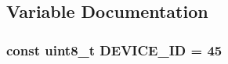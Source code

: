 \subsection{Variable Documentation}
\hypertarget{Surrogate_8ino_ab626366a28e9f4d297a10d5958647f3a}{
\subsubsection[{D\-E\-V\-I\-C\-E\-\_\-\-I\-D}]{\setlength{\rightskip}{0pt plus 5cm}const uint8\-\_\-t D\-E\-V\-I\-C\-E\-\_\-\-I\-D = 45}}\label{Surrogate_8ino_ab626366a28e9f4d297a10d5958647f3a}
